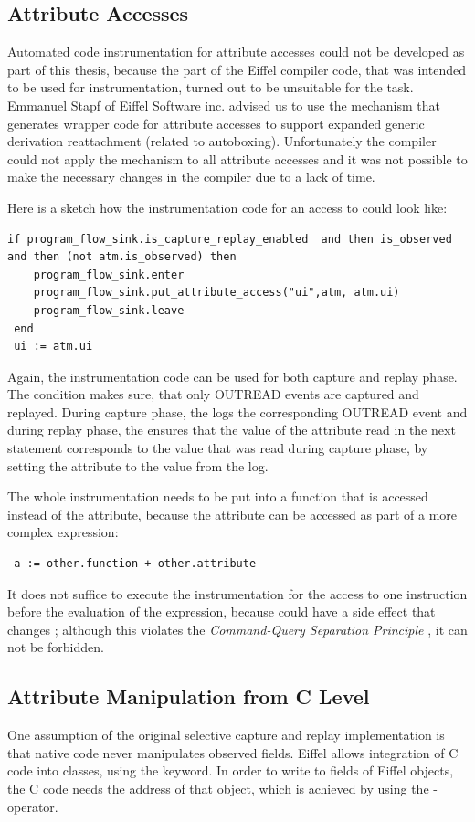 \subsection{Attribute Accesses}
Automated code instrumentation for attribute accesses could not be developed as part of this thesis, because the part of the Eiffel compiler code, that was intended to be used for instrumentation, turned out to be unsuitable for the task. Emmanuel Stapf of Eiffel Software inc. advised us to use the mechanism that generates wrapper code for attribute accesses to support expanded generic derivation reattachment (related to autoboxing). Unfortunately the compiler could not apply the mechanism to all attribute accesses and it was not possible to make the necessary changes in the compiler due to a lack of time.

Here is a sketch how the instrumentation code for an access to  could look like:
\begin{lstlisting}[caption=Instrumentation of an Attribute Access]
 if program_flow_sink.is_capture_replay_enabled  and then is_observed and then (not atm.is_observed) then
	program_flow_sink.enter
	program_flow_sink.put_attribute_access("ui",atm, atm.ui)
	program_flow_sink.leave
 end
 ui := atm.ui
\end{lstlisting}
Again, the instrumentation code can be used for both capture and replay phase. The condition makes sure, that only OUTREAD events are captured and replayed. During capture phase, the  logs the corresponding OUTREAD event and during replay phase, the  ensures that the value of the attribute read in the next statement corresponds to the value that was read during capture phase, by setting the attribute to the value from the log.

The whole instrumentation needs to be put into a function that is accessed instead of the attribute, because the attribute can be accessed as part of a more complex expression:
\begin{lstlisting}
 a := other.function + other.attribute
\end{lstlisting}
It does not suffice to execute the instrumentation for the access to  one instruction before the evaluation of the expression, because  could have a side effect that changes ; although this violates the \emph{Command-Query Separation Principle} \cite{oosc2}, it can not be forbidden.


\subsection{Attribute Manipulation from C Level}
One assumption of the original selective capture and replay implementation is that native code never manipulates observed fields. Eiffel allows integration of C code into classes, using the  keyword. In order to write to fields of Eiffel objects, the C code needs the address of that object, which is achieved by using the \identifier{\$} - operator.


